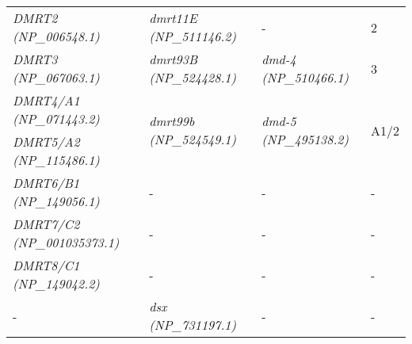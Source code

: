 \documentclass[../main.tex]{subfiles}
\begin{document}
\begin{longtable}{llll}
	\textit{DMRT2 (NP\_006548.1)}                           & \textit{dmrt11E (NP\_511146.2)}                                                                        & -                                                                                                  & 2                     \\ [0.1cm]
	\textit{DMRT3 (NP\_067063.1)}                           & \textit{dmrt93B (NP\_524428.1)}                                                                        & \textit{dmd-4 (NP\_510466.1)}                                                                      & 3                     \\ [0.2cm]
	\textit{DMRT4/A1 (NP\_071443.2)}                        & \multirow{2}{*}{\textit{dmrt99b (NP\_524549.1)}}                                                       & \multirow{2}{*}{\textit{dmd-5 (NP\_495138.2)}}                                                     & \multirow{2}{*}{A1/2} \\
	\textit{DMRT5/A2 (NP\_115486.1)}                        &                                                                                                        &                                                                                                    &                       \\ [0.2cm]
	\textit{DMRT6/B1 (NP\_149056.1)}                        & -                                                                                                      & -                                                                                                  & -                     \\ [0.1cm]
	\textit{DMRT7/C2 (NP\_001035373.1)}                     & -                                                                                                      & -                                                                                                  & -                     \\ [0.1cm]
	\textit{DMRT8/C1 (NP\_149042.2)}                        & -                                                                                                      & -                                                                                                  & -                     \\ [0.1cm]
	-                                                       & \textit{dsx (NP\_731197.1)}                                                                            & -                                                                                                  & -                     \\ [0.1cm]

\end{longtable}
\end{document}
